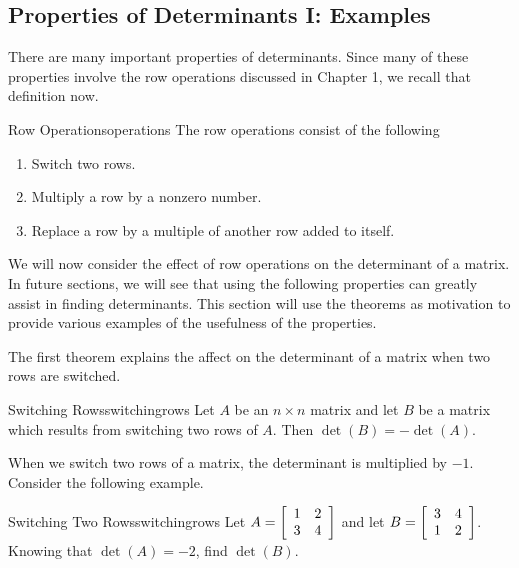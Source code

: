 \subsection{Properties of Determinants I: Examples}

There are many important properties of determinants. Since many of these properties involve
the row operations discussed in Chapter 1, we recall that definition now. 

\begin{definition}{Row Operations}{operations}
The row operations
consist of the following

\begin{enumerate}
\item Switch two rows.

\item Multiply a row by a nonzero number.

\item Replace a row by a multiple of another row added to itself.
\end{enumerate}
\end{definition}

We will now consider the effect of row operations on the determinant of a matrix. In future sections, we will see that using the following properties can 
greatly assist in finding determinants. This section will use the theorems as motivation to provide various examples of the usefulness of the properties. 

The first theorem explains the affect on the determinant of a matrix when two rows are switched. 

\begin{theorem}{Switching Rows}{switchingrows}
Let $A$ be an $n\times n$ matrix and let $B$ be a matrix
which results from switching two rows of $A.$ Then $\det \left( B\right)
= - \det \left( A\right) .$ 
\end{theorem}

When we switch two rows of a matrix, the determinant is multiplied by $-1$. Consider the following example.

\begin{example}{Switching Two Rows}{switchingrows}
Let $A=\left[
\begin{array}{rr}
1 & 2 \\
3 & 4
\end{array}
\right] $ and let $B=\left[
\begin{array}{rr}
3 & 4 \\
1 & 2
\end{array}
\right] $. 
Knowing that $\det \left( A \right) =-2$, find $\det \left( B \right) $.
\end{example}

